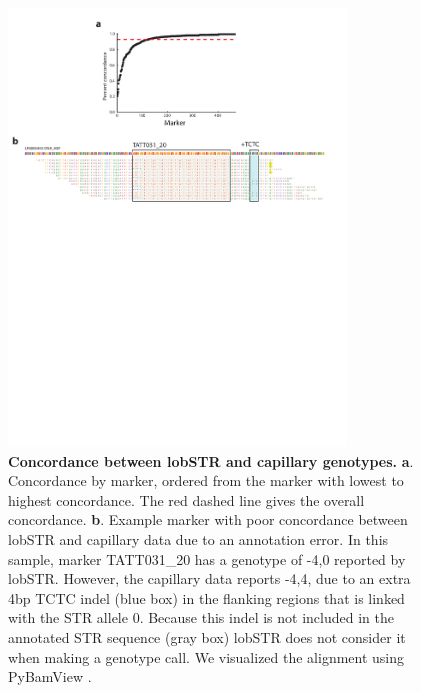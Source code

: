 \begin{figure}[h!]
\centering
\label{fig:sgdpfig2}
\includegraphics[width=0.8\textwidth]{Figures/App3/Fig2.pdf}
\caption{\textbf{Concordance between lobSTR and capillary genotypes.} \textbf{a}. Concordance by marker, ordered from the marker with lowest to highest concordance. The red dashed line gives the overall concordance. \textbf{b}. Example marker with poor concordance between lobSTR and capillary data due to an annotation error. In this sample, marker TATT031\_20 has a genotype of -4,0 reported by lobSTR. However, the capillary data reports -4,4, due to an extra 4bp TCTC indel (blue box) in the flanking regions that is linked with the STR allele 0. Because this indel is not included in the annotated STR sequence (gray box) lobSTR does not consider it when making a genotype call. We visualized the alignment using PyBamView \cite{Gymrek2014}.}
\end{figure}

